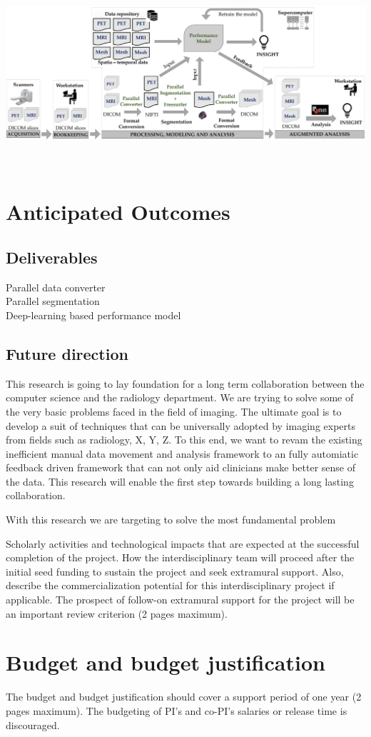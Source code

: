 \documentclass[11pt]{article}
\begin{document}
\includegraphics[width=1\textwidth, height=7cm]{Proposed.pdf}\\

\section{Anticipated Outcomes}

\subsection{Deliverables}

Parallel data converter \\
Parallel segmentation \\
Deep-learning based performance model \\

\subsection{Future direction}
This research is going to lay foundation for a long term collaboration between the computer science and the radiology department. We are trying to solve some of the very basic problems faced in the field of imaging. The ultimate goal is to develop a suit of techniques that can be universally adopted by imaging experts from fields such as radiology, X, Y, Z. To this end, we want to revam the existing inefficient manual data movement and analysis framework to an fully automiatic feedback driven framework that can not only aid clinicians make better sense of the data. This research will enable the first step towards building a long lasting collaboration.

With this research we are targeting to solve the most fundamental problem

Scholarly activities and technological impacts that are
expected at the successful completion of the project. How the interdisciplinary
team will proceed after the initial seed funding to sustain the project and seek
extramural support. Also, describe the commercialization potential for this
interdisciplinary project if applicable. The prospect of follow-on extramural
support for the project will be an important review criterion (2 pages maximum).

\section{Budget and budget justification}
The budget and budget justification should cover a support period of one year (2 pages maximum). The budgeting of PI’s and co-PI’s salaries or release time is discouraged.  
\end{document}
